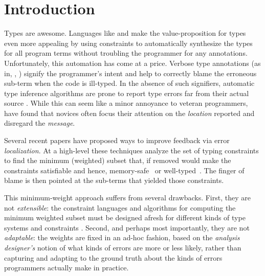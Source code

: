\section{Introduction}
\label{sec:introduction}

%
Types are awesome.
%
Languages like \ocaml and \haskell make
the value-proposition for types even more
appealing by using constraints to automatically
synthesize the types for all program terms
without troubling the programmer for any
annotations.
%
Unfortunately, this automation has come at a price.
Verbose type annotations (as in, \eg, \java) signify
the programmer's intent and help to correctly
blame the erroneous sub-term when the code is
ill-typed.
%
In the absence of such signifiers, automatic
type inference algorithms are prone to report
type errors far from their actual source
\citep{Wand1986-nw}.
%
While this can seem like a minor annoyance to
veteran programmers, \citet{Joosten1993-yx} have found
that novices often focus their attention on the \emph{location}
reported and disregard the \emph{message}.

%
Several recent papers have proposed ways
to improve feedback via error \emph{localization}.
%
At a high-level these techniques analyze
the set of typing constraints to find
the minimum (weighted) subset that,
if removed would make the constraints
satisfiable and hence, memory-safe~\citep{Jose:2011}
or well-typed~\citep{Zhang2014-lv,Loncaric2016-uk,Chen2014-gd,Pavlinovic2014-mr}.
The finger of blame is then pointed at the
sub-terms that yielded those constraints.

This minimum-weight approach suffers
from several drawbacks.
%
First, they are not \emph{extensible}:
the constraint languages and algorithms for computing
the minimum weighted subset must be
designed afresh for different kinds
of type systems and constraints \citep{Loncaric2016-uk}.
%
Second, and perhaps most importantly,
they are not \emph{adaptable}: the
weights are fixed in an ad-hoc fashion, based on the
\emph{analysis designer's} notion
of what kinds of errors are more
or less likely, rather than
capturing and adapting to the
ground truth about the kinds
of errors programmers actually
make in practice.

